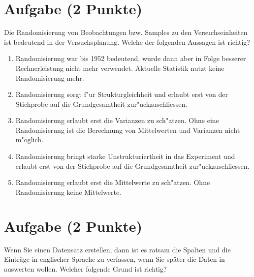 \documentclass[a4paper, 10pt]{scrartcl}\usepackage[]{graphicx}\usepackage[]{xcolor}
\begin{document}
\section{Aufgabe \hfill (2 Punkte)}

Die Randomisierung von Beobachtungen bzw. Samples zu den Versuchseinheiten
ist bedeutend in der Versuchsplanung. Welche der folgenden Aussagen ist richtig?



\begin{enumerate}
\item [\textbf{A} \msquare] Randomisierung war bis 1952 bedeutend, wurde dann aber in Folge besserer Rechnerleistung nicht mehr verwendet. Aktuelle Statistik nutzt keine Randomisierung mehr.
\item [\textbf{B} \msquare] Randomisierung sorgt f{"u}r Strukturgleichheit und erlaubt erst von der Stichprobe auf die Grundgesamtheit zur{"u}ckzuschliessen.
\item [\textbf{C} \msquare] Randomisierung erlaubt erst die Varianzen zu sch{"a}tzen. Ohne eine Randomisierung ist die Berechnung von Mittelwerten und Varianzen nicht m{"o}glich.
\item [\textbf{D} \msquare] Randomisierung bringt starke Unstrukturiertheit in das Experiment und erlaubt erst von der Stichprobe auf die Grundgesamtheit zur{"u}ckzuschliessen.
\item [\textbf{E} \msquare] Randomisierung erlaubt erst die Mittelwerte zu sch{"a}tzen. Ohne Randomisierung keine Mittelwerte.
\end{enumerate}

\section{Aufgabe \hfill (2 Punkte)}

Wenn Sie einen Datensatz erstellen, dann ist es ratsam die Spalten und die
Eintr{\"a}ge in englischer Sprache zu verfassen, wenn Sie sp{\"a}ter die Daten in
\Rlogo auswerten wollen. Welcher folgende Grund ist richtig?
\end{document}
